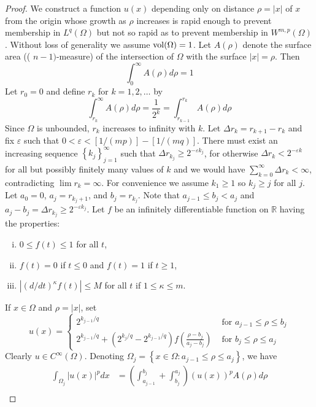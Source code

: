 \begin{proof}
  We construct a function $u(x)$ depending only on distance $\rho=|x|$ of $x$ from the origin whose growth as $\rho$ increases is rapid enough to prevent membership in $L^q(\Omega)$ but not so rapid as to prevent membership in $W^{m,p}(\Omega)$.
  Without loss of generality we assume $\operatorname{vol}(\Omega)=1$. Let $A(\rho)$ denote the surface area (( $n-1)$-measure) of the intersection of $\Omega$ with the surface $|x|=\rho$. Then
  \[
  \int_0^{\infty} A(\rho) d \rho=1
  \]
  Let $r_0=0$ and define $r_k$ for $k=1,2, \ldots$ by
  \[
  \int_{r_k}^{\infty} A(\rho) d \rho=\frac{1}{2^k}=\int_{r_{k-1}}^{r_k} A(\rho) d \rho
  \]
  Since $\Omega$ is unbounded, $r_k$ increases to infinity with $k$. Let $\Delta r_k=r_{k+1}-r_k$ and fix $\varepsilon$ such that $0<\varepsilon<[1 /(m p)]-[1 /(m q)]$. There must exist an increasing sequence $\left\{k_j\right\}_{j=1}^{\infty}$ such that $\Delta r_{k_j} \geq 2^{-\varepsilon k_j}$, for otherwise $\Delta r_k<2^{-\varepsilon k}$ for all but possibly finitely many values of $k$ and we would have $\sum_{k=0}^{\infty} \Delta r_k<\infty$, contradicting $\lim r_k=\infty$. For convenience we assume $k_1 \geq 1$ so $k_j \geq j$ for all $j$. Let $a_0=0$, $a_j=r_{k_j+1}$, and $b_j=r_{k_j}$. Note that $a_{j-1} \leq b_j<a_j$ and $a_j-b_j=\Delta r_{k_j} \geq 2^{-\varepsilon k_j}$.
  Let $f$ be an infinitely differentiable function on $\mathbb{R}$ having the properties:
  \begin{enumerate}[(i)]
    \item $0 \leq f(t) \leq 1$ for all $t$,
    \item $f(t)=0$ if $t \leq 0$ and $f(t)=1$ if $t \geq 1$,
    \item $\left|(d / d t)^\kappa f(t)\right| \leq M$ for all $t$ if $1 \leq \kappa \leq m$.
  \end{enumerate}
  If $x \in \Omega$ and $\rho=|x|$, set
  \[
  u(x)= \begin{cases}2^{k_{j-1} / q} & \text { for } a_{j-1} \leq \rho \leq b_j \\ 2^{k_{j-1} / q}+\left(2^{k_j / q}-2^{k_{j-1} / q}\right) f\left(\frac{\rho-b_j}{a_j-b_j}\right) & \text { for } b_j \leq \rho \leq a_j\end{cases}
  \]
  Clearly $u \in C^{\infty}(\Omega)$. Denoting $\Omega_j=\left\{x \in \Omega: a_{j-1} \leq \rho \leq a_j\right\}$, we have
  \[
  \begin{aligned}
  \int_{\Omega_j}|u(x)|^p d x & =\left(\int_{a_{j-1}}^{b_j}+\int_{b_j}^{a_j}\right)(u(x))^p A(\rho) d \rho \\

\end{aligned}\]
\end{proof}
